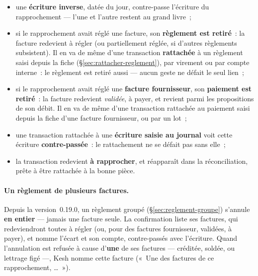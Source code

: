 \documentclass[a4paper,11pt,oneside]{article}
\begin{document}
\begin{itemize}
    \item une \textbf{écriture inverse}, datée du jour, contre-passe l'écriture du rapprochement
          --- l'une et l'autre restent au grand livre~;
    \item si le rapprochement avait réglé une facture, son \textbf{règlement est retiré}~: la
          facture redevient à régler (ou partiellement réglée, si d'autres règlements
          subsistent). Il en va de même d'une transaction \textbf{rattachée} à un règlement
          saisi depuis la fiche (\S\ref{sec:rattacher-reglement}), par virement ou par compte
          interne~: le règlement est retiré aussi --- aucun geste ne défait le seul lien~;
    \item si le rapprochement avait réglé une \textbf{facture fournisseur}, son
          \textbf{paiement est retiré}~: la facture redevient \emph{validée}, à payer, et
          revient parmi les propositions de son débit. Il en va de même d'une transaction
          rattachée au paiement saisi depuis la fiche d'une facture fournisseur, ou par un lot~;
    \item une transaction rattachée à une \textbf{écriture saisie au journal} voit cette
          écriture \textbf{contre-passée}~: le rattachement ne se défait pas sans elle~;
    \item la transaction redevient \textbf{à rapprocher}, et réapparaît dans la réconciliation,
          prête à être rattachée à la bonne pièce.
\end{itemize}

\paragraph{Un règlement de plusieurs factures.} Depuis la version~0.19.0, un règlement groupé
(\S\ref{sec:reglement-groupe}) s'annule \textbf{en entier} --- jamais une facture seule. La
confirmation liste ses factures, qui redeviendront toutes à régler (ou, pour des factures
fournisseur, validées, à payer), et nomme l'écart et son compte, contre-passés avec l'écriture.
Quand l'annulation est refusée à cause d'\textbf{une} de ses factures --- créditée, soldée, ou
lettrage figé ---, Kesh nomme cette facture («~Une des factures de ce rapprochement, \ldots~»).
\end{document}
